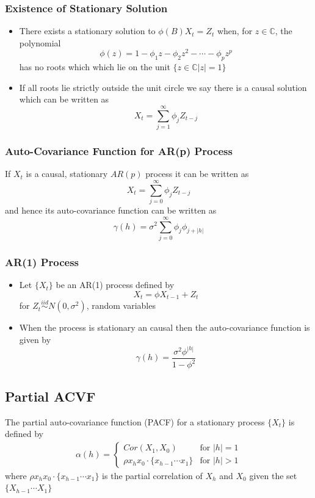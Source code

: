 \documentclass[11pt]{article}
\newcommand{\C}{{\mathbb{C}}}
\begin{document}
\subsubsection{Existence of Stationary Solution}
\begin{itemize}
    \item There exists a stationary solution to $\phi(B)X_t=Z_t$ when, for $z\in\C$, the polynomial \[\phi(z) = 1-\phi_1z-\phi_2z^2-\cdots-\phi_pz^p\] has no roots which which lie on the unit $\{z\in\C|z|=1\}$
    \item If all roots lie strictly outside the unit circle we say there is a causal solution which can be written as \[X_t=\sum_{j=1}^{\infty}\phi_jZ_{t-j}\]
\end{itemize}
\subsubsection{Auto-Covariance Function for AR(p) Process}
If $X_t$ is a causal, stationary $AR(p)$ process it can be written as \[X_t=\sum_{j=0}^{\infty}\phi_jZ_{t-j}\] and hence its auto-covariance function can be written as \[\gamma(h)=\sigma^2\sum_{j=0}^{\infty}\phi_j\phi_{j+|h|}\]
\subsubsection{AR(1) Process}
\begin{itemize}
    \item Let $\{X_t\}$ be an AR(1) process defined by \[X_t=\phi X_{t-1}+Z_t\] for $Z_t\overset{iid}{\sim} N(0,\sigma^2)$, random variables 
    \item When the process is stationary an causal then the auto-covariance function is given by \[\gamma(h)=\dfrac{\sigma^2\phi^{|h|}}{1-\phi^2}\]    
\end{itemize}
\subsection{Partial ACVF}
The partial auto-covariance function (PACF) for a stationary process $\{X_t\}$ is defined by
\begin{align*}
    \alpha(h) = 
    \begin{cases}
        Cor(X_1,X_0) &\text{for }|h| = 1 \\
        \rho x_hx_0\cdot\{x_{h-1}\cdots x_1\} &\text{for }|h|>1
    \end{cases}
\end{align*}
where $\rho x_hx_0\cdot\{x_{h-1}\cdots x_1\}$ is the partial correlation of $X_h$ and $X_0$ given the set $\{X_{h-1}\cdots X_1\}$
\end{document}
